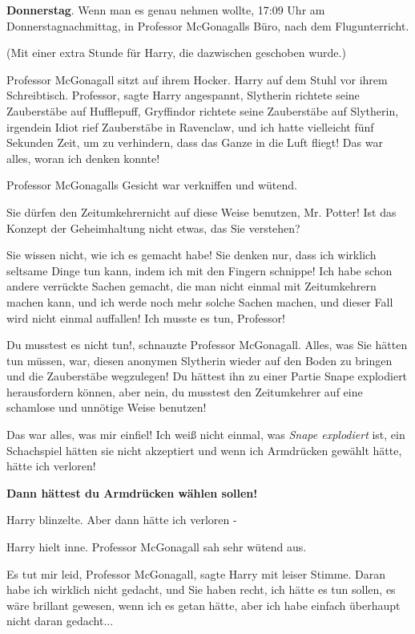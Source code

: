 \textbf{Donnerstag}. Wenn man es genau nehmen wollte, 17:09 Uhr am
Donnerstagnachmittag, in Professor McGonagalls Büro, nach dem Flugunterricht.

(Mit einer extra Stunde für Harry, die dazwischen geschoben wurde.)

Professor McGonagall sitzt auf ihrem Hocker. Harry auf dem Stuhl vor ihrem
Schreibtisch. \glqq Professor\grqq{}, sagte Harry angespannt, \glqq Slytherin
richtete seine Zauberstäbe auf Hufflepuff, Gryffindor richtete seine Zauberstäbe
auf Slytherin, irgendein Idiot rief Zauberstäbe in Ravenclaw, und ich hatte
vielleicht fünf Sekunden Zeit, um zu verhindern, dass das Ganze in die Luft
fliegt! Das war alles, woran ich denken konnte!\grqq{}

Professor McGonagalls Gesicht war verkniffen und wütend.

\glqq Sie dürfen den Zeitumkehrernicht auf diese Weise benutzen, Mr. Potter! Ist
das Konzept der Geheimhaltung nicht etwas, das Sie verstehen?\grqq{}

\glqq Sie wissen nicht, wie ich es gemacht habe! Sie denken nur, dass ich
wirklich seltsame Dinge tun kann, indem ich mit den Fingern schnippe! Ich habe
schon andere verrückte Sachen gemacht, die man nicht einmal mit Zeitumkehrern
machen kann, und ich werde noch mehr solche Sachen machen, und dieser Fall wird
nicht einmal auffallen! Ich musste es tun, Professor!\grqq{}

\glqq Du musstest es nicht tun!\grqq{}, schnauzte Professor McGonagall. \glqq
Alles, was Sie hätten tun müssen, war, diesen anonymen Slytherin wieder auf den
Boden zu bringen und die Zauberstäbe wegzulegen! Du hättest ihn zu einer Partie
Snape explodiert herausfordern können, aber nein, du musstest den Zeitumkehrer
auf eine schamlose und unnötige Weise benutzen!\grqq{}

\glqq Das war alles, was mir einfiel! Ich weiß nicht einmal, was \emph{Snape
explodiert} ist, ein Schachspiel hätten sie nicht akzeptiert und wenn ich
Armdrücken gewählt hätte, hätte ich verloren!\grqq{}

\textbf{\glqq Dann hättest du Armdrücken wählen sollen!\grqq{} }

Harry blinzelte. \glqq Aber dann hätte ich verloren -\grqq{}

Harry hielt inne. Professor McGonagall sah sehr wütend aus.

\glqq Es tut mir leid, Professor McGonagall\grqq{}, sagte Harry mit leiser
Stimme. \glqq Daran habe ich wirklich nicht gedacht, und Sie haben recht, ich
hätte es tun sollen, es wäre brillant gewesen, wenn ich es getan hätte, aber ich
habe einfach überhaupt nicht daran gedacht...\grqq{}

